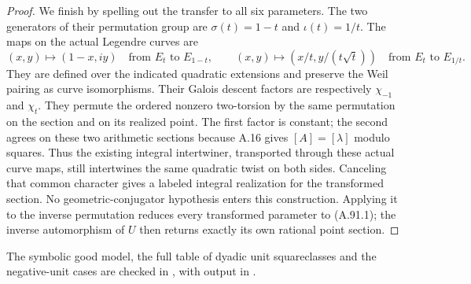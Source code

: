 \begin{proof}
We finish by spelling out the transfer to all six
parameters.  The two generators of their permutation
group are $\sigma(t)=1-t$ and $\iota(t)=1/t$.
The maps on the actual Legendre curves are
\[
 (x,y)\longmapsto(1-x,iy)
          \quad\text{from }E_t\text{ to }E_{1-t},
 \qquad
 (x,y)\longmapsto(x/t,y/(t\sqrt t))
          \quad\text{from }E_t\text{ to }E_{1/t}.
\tag{A.91.6}
\]
They are defined over the indicated quadratic
extensions and preserve the Weil pairing as curve
isomorphisms.  Their Galois descent factors are
respectively $\chi_{-1}$ and $\chi_t$.
They permute the ordered nonzero two-torsion by
the same permutation on the section and on its
realized point.  The first factor is constant;
the second agrees on these two arithmetic sections
because A.16 gives $[A]=[\lambda]$ modulo squares.
Thus the existing integral intertwiner, transported
through these actual curve maps, still intertwines
the same quadratic twist on both sides.
Canceling that common character gives a labeled
integral realization for the transformed section.
No geometric-conjugator hypothesis enters this
construction.  Applying it to the inverse
permutation reduces every transformed parameter
to (A.91.1); the inverse automorphism of $U$ then
returns exactly its own rational point section.
\end{proof}

The symbolic good model, the full table of dyadic
unit squareclasses and the negative-unit cases are
checked in
,
with output in
.
